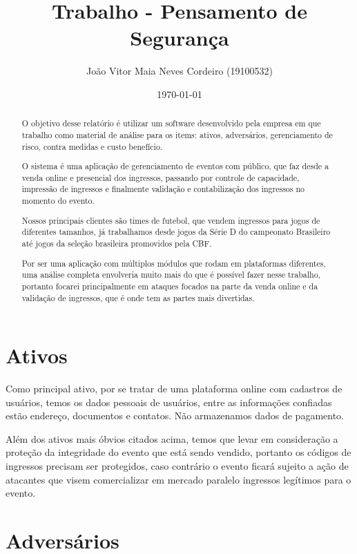 \documentclass[12pt]{article}
\author{João Vitor Maia Neves Cordeiro (19100532)}
\title{Trabalho - Pensamento de Segurança}
\date{\today}
\begin{document}
\maketitle

\begin{abstract}

O objetivo desse relatório é utilizar um software desenvolvido pela empresa em que trabalho como material de análise para os items: ativos, adversários, gerenciamento de risco, contra medidas e custo benefício.

O sistema é uma aplicação de gerenciamento de eventos com público, que faz desde a venda online e presencial dos ingressos, passando por controle de capacidade, impressão de ingressos e finalmente validação e contabilização dos ingressos no momento do evento.

Nossos principais clientes são times de futebol, que vendem ingressos para jogos de diferentes tamanhos, já trabalhamos desde jogos da Série D do campeonato Brasileiro até jogos da seleção brasileira promovidos pela CBF.

Por ser uma aplicação com múltiplos módulos que rodam em plataformas diferentes, uma análise completa envolveria muito mais do que é possível fazer nesse trabalho, portanto focarei principalmente em ataques focados na parte da venda online e da validação de ingressos, que é onde tem as partes mais divertidas. 

\end{abstract}

\section*{Ativos}

Como principal ativo, por se tratar de uma plataforma online com cadastros de usuários, temos os dados pessoais de usuários, entre as informações confiadas estão endereço, documentos e contatos. Não armazenamos dados de pagamento.

Além dos ativos mais óbvios citados acima, temos que levar em consideração a proteção da integridade do evento que está sendo vendido, portanto os códigos de ingressos precisam ser protegidos, caso contrário o evento ficará sujeito a ação de atacantes que visem comercializar em mercado paralelo ingressos legítimos para o evento.

\section*{Adversários}
\end{document}
